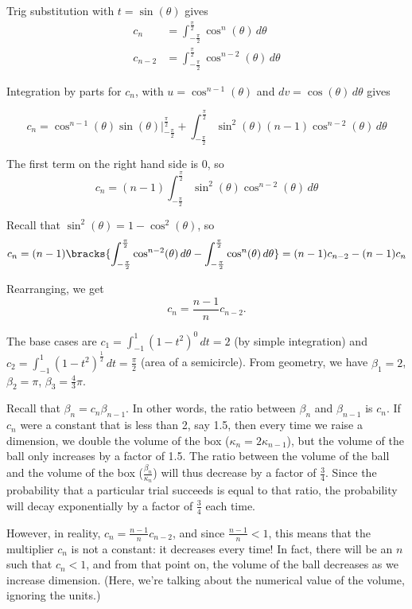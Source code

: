 \documentclass{article}
\begin{document}
Trig substitution with $t = \sin(\theta)$ gives
\begin{align*}
  c_n     & = \int_{-\frac{\pi}{2}}^{\frac{\pi}{2}} \cos^{n}(\theta) \, d\theta   \\
  c_{n-2} & = \int_{-\frac{\pi}{2}}^{\frac{\pi}{2}} \cos^{n-2}(\theta) \, d\theta
\end{align*}

Integration by parts for $c_n$, with $u = \cos^{n-1}(\theta)$ and $dv = \cos(\theta) \, d\theta$ gives

\[
  c_n = \cos^{n-1}(\theta) \sin(\theta) \bigg|_{-\frac{\pi}{2}}^{\frac{\pi}{2}} + \int_{-\frac{\pi}{2}}^{\frac{\pi}{2}} \sin^2(\theta) (n-1) \cos^{n-2}(\theta) \, d\theta
\]

The first term on the right hand side is 0, so
\[
  c_n = (n-1) \int_{-\frac{\pi}{2}}^{\frac{\pi}{2}} \sin^2(\theta) \cos^{n-2}(\theta) \, d\theta
\]

Recall that $\sin^2(\theta) = 1 - \cos^2(\theta)$, so
\[
  c_n = (n-1) \bracks{\int_{-\frac{\pi}{2}}^{\frac{\pi}{2}} \cos^{n-2}(\theta) \, d\theta - \int_{-\frac{\pi}{2}}^{\frac{\pi}{2}} \cos^n(\theta) \, d\theta} = (n-1) c_{n-2} - (n-1) c_n
\]

Rearranging, we get
\[
  c_n = \frac{n-1}{n}c_{n-2}.
\]

The base cases are $c_1 = \int_{-1}^1 (1 - t^2)^0 \, dt = 2$ (by simple integration) and $c_2 = \int_{-1}^1 (1 - t^2)^{\frac{1}{2}} \, dt = \frac{\pi}{2}$ (area of a semicircle). From geometry, we have $\beta_1 = 2$, $\beta_2 = \pi$, $\beta_3 = \frac{4}{3}\pi$.

Recall that $\beta_n = c_n \beta_{n - 1}$. In other words, the ratio between $\beta_n$ and $\beta_{n - 1}$ is $c_n$. If $c_n$ were a constant that is less than 2, say 1.5, then every time we raise a dimension, we double the volume of the box ($\kappa_{n} = 2 \kappa_{n - 1}$), but the volume of the ball only increases by a factor of 1.5. The ratio between the volume of the ball and the volume of the box ($\frac{\beta_n}{\kappa_n}$) will thus decrease by a factor of $\frac{3}{4}$. Since the probability that a particular trial succeeds is equal to that ratio, the probability will decay exponentially by a factor of $\frac{3}{4}$ each time.

However, in reality, $c_n = \frac{n-1}{n}c_{n-2}$, and since $\frac{n-1}{n} < 1$, this means that the multiplier $c_n$ is not a constant: it decreases every time! In fact, there will be an $n$ such that $c_n < 1$, and from that point on, the volume of the ball decreases as we increase dimension. (Here, we're talking about the numerical value of the volume, ignoring the units.)
\end{document}
